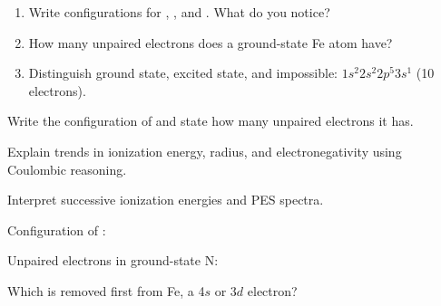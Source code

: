 \documentclass{apchem-notes}
\begin{document}
\begin{enumerate}[leftmargin=*,itemsep=0.4em]
  \item Write configurations for , , and . What do
        you notice? 
  \item How many unpaired electrons does a ground-state Fe atom have?
  \item Distinguish ground state, excited state, and impossible:
        $1s^2 2s^2 2p^5 3s^1$ (10 electrons).
\end{enumerate}

\begin{exitticket}
Write the configuration of  and state how many unpaired electrons
it has. 
\end{exitticket}


\begin{objectives}
  \item Explain trends in ionization energy, radius, and electronegativity
        using Coulombic reasoning.
  \item Interpret successive ionization energies and PES spectra.
\end{objectives}


\begin{warmup}[3]
  \item Configuration of : 
  \item Unpaired electrons in ground-state N: 
  \item Which is removed first from Fe, a 4$s$ or 3$d$ electron?
\end{warmup}

\end{document}
